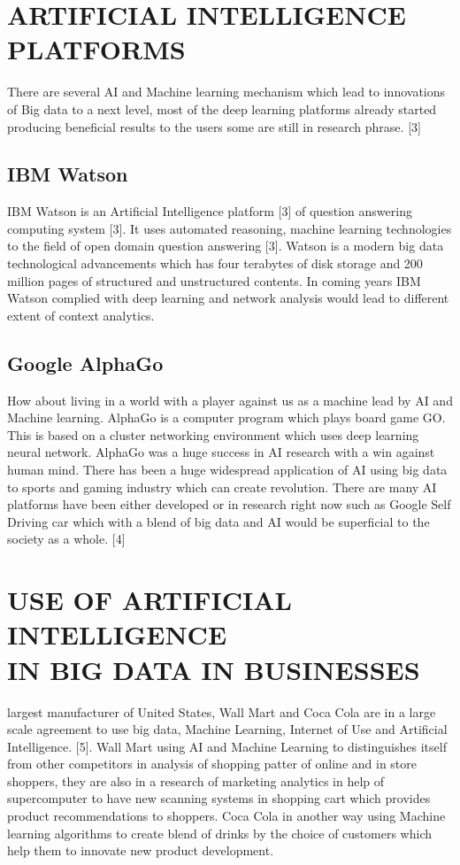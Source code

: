 \documentclass{sig-alternate}
\begin{document}
\section{ARTIFICIAL INTELLIGENCE 
\\PLATFORMS}
There are several AI and Machine learning mechanism which lead to innovations of Big data to a next level, most of the deep learning platforms already started producing beneficial results to the users some are still in research phrase. [3]

\subsection{IBM Watson}
IBM Watson is an Artificial Intelligence platform [3] of question answering computing system [3].  It uses automated reasoning, machine learning technologies to the field of open domain question answering [3]. Watson is a modern big data technological advancements which has four terabytes of disk storage and 200 million pages of structured and unstructured contents. In coming years IBM Watson complied with deep learning and network analysis would lead to different extent of context analytics.

\subsection{Google AlphaGo}
How about living in a world with a player against us as a machine lead by AI and Machine learning. AlphaGo is a computer program which plays board game GO. This is based on a cluster networking environment which uses deep learning neural network. AlphaGo was a huge success in AI research with a win against human mind. There has been a huge widespread application of AI using big data to sports and gaming industry which can create revolution. There are many AI platforms have been either developed or in research right now such as Google Self Driving car which with a blend of big data and AI would be superficial to the society as a whole. [4]

\section{USE OF ARTIFICIAL INTELLIGENCE 
\\IN BIG DATA IN BUSINESSES }
largest manufacturer of United States, Wall Mart and Coca Cola are in a large scale agreement to use big data, Machine Learning, Internet of Use and Artificial Intelligence. [5]. Wall Mart using AI and Machine Learning to distinguishes itself from other competitors in analysis of shopping patter of online and in store shoppers, they are also in a research of marketing analytics in help of supercomputer to have new scanning systems in shopping cart which provides product recommendations to shoppers. Coca Cola in another way using Machine learning algorithms to create blend of drinks by the choice of customers which help them to innovate new product development. 
\end{document}
